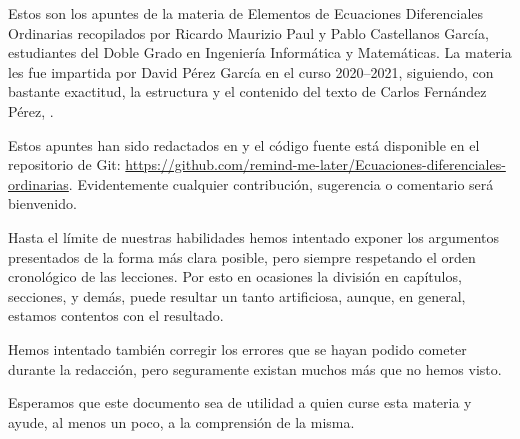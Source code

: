 \documentclass[ecuaciones_diferenciales.tex]{subfiles}
\begin{document}
Estos son los apuntes de la materia de Elementos de Ecuaciones Diferenciales
Ordinarias recopilados por Ricardo Maurizio Paul y Pablo Castellanos García,
estudiantes del Doble Grado en Ingeniería Informática y Matemáticas. La materia
les fue impartida por David Pérez García en el curso 2020--2021, siguiendo, con
bastante exactitud, la estructura y el contenido del texto de Carlos Fernández
Pérez, \cite{ecuaciones_lineales}.

Estos apuntes han sido redactados en  y el código fuente 
está disponible en el repositorio de Git:
\url{https://github.com/remind-me-later/Ecuaciones-diferenciales-ordinarias}.
Evidentemente cualquier contribución, sugerencia o comentario será bienvenido.

Hasta el límite de nuestras habilidades hemos intentado exponer los argumentos 
presentados de la forma más clara posible, pero siempre respetando el orden
cronológico de las lecciones. Por esto en ocasiones la división en capítulos,
secciones, y demás, puede resultar un tanto artificiosa, aunque, en general,
estamos contentos con el resultado.

Hemos intentado también corregir los errores que se hayan podido cometer durante
la redacción, pero seguramente existan muchos más que no hemos visto.

Esperamos que este documento sea de utilidad a quien curse esta materia y ayude,
al menos un poco, a la comprensión de la misma.
\end{document}
